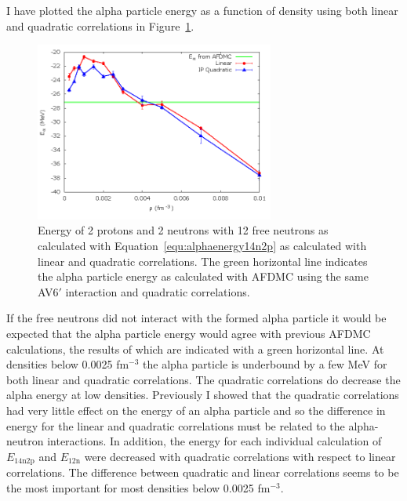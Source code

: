 I have plotted the alpha particle energy as a function of density using both linear and quadratic correlations in Figure~\ref{fig:alpha}.
\begin{figure}[h!]
   \centering
   \includegraphics[width=0.7\textwidth]{figures/alpha.png}
   \caption{Energy of 2 protons and 2 neutrons with 12 free neutrons as calculated with Equation~\ref{equ:alphaenergy14n2p} as calculated with linear and quadratic correlations. The green horizontal line indicates the alpha particle energy as calculated with AFDMC using the same AV6$'$ interaction and quadratic correlations.}
   \label{fig:alpha}
\end{figure}
If the free neutrons did not interact with the formed alpha particle it would be expected that the alpha particle energy would agree with previous AFDMC calculations, the results of which are indicated with a green horizontal line. At densities below 0.0025 fm$^{-3}$ the alpha particle is underbound by a few MeV for both linear and quadratic correlations. The quadratic correlations do decrease the alpha energy at low densities. Previously I showed that the quadratic correlations had very little effect on the energy of an alpha particle and so the difference in energy for the linear and quadratic correlations must be related to the alpha-neutron interactions. In addition, the energy for each individual calculation of $E_\text{14n2p}$ and $E_\text{12n}$ were decreased with quadratic correlations with respect to linear correlations. The difference between quadratic and linear correlations seems to be the most important for most densities below 0.0025 fm$^{-3}$.

